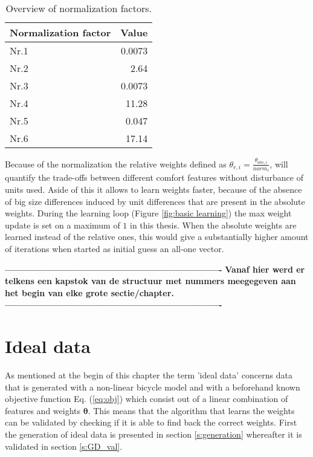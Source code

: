 \begin{table}[h!]
  \centering
  \begin{tabular}{@{}lr@{}} 
    Normalization factor    & Value\\ \midrule
    Nr.1      & 0.0073\\
    Nr.2          & 2.64\\
    Nr.3 	   & 0.0073\\
    Nr.4       & 11.28\\
    Nr.5       & 0.047\\
    Nr.6  & 17.14\\ \bottomrule
  \end{tabular}
  \caption{Overview of  normalization factors.}
  \label{table:norm}
\end{table}

Because of the normalization the relative weights defined as $\theta_{r,i} = \frac{\theta_{abs,i}}{norm_i}$, will quantify the trade-offs between different comfort features without disturbance of units used. Aside of this it allows to learn weights faster, because of the absence of big size differences induced by unit differences that are present in the absolute weights. During the learning loop (Figure \ref{fig:basic learning}) the max weight update is set on a maximum of $1$ in this thesis. When the absolute weights are learned instead of the relative ones, this would give a substantially higher amount of iterations when started as initial guess an all-one vector.

\textbf{-------------------------------------------------------------------}
\textbf{Vanaf hier werd er telkens een kapstok van de structuur met nummers meegegeven aan het begin van elke grote sectie/chapter.}
\textbf{-------------------------------------------------------------------}

\section{Ideal data} \label{s:GD}
As mentioned at the begin of this chapter the term 'ideal data' concerns data that is generated with a non-linear bicycle model and with a beforehand known objective function Eq. (\ref{eq:obj}) which consist out of a linear combination of features and weights $\bm{\theta}$. This means that the algorithm that learns the weights can be validated by checking if it is able to find back the correct weights. First the generation of ideal data is presented in section \ref{s:generation} whereafter it is validated in section \ref{s:GD_val}.

